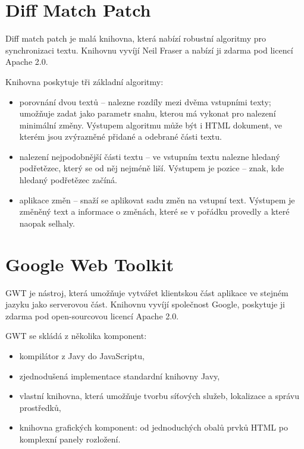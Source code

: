 \section{Diff Match Patch}
Diff match patch je malá knihovna, která nabízí robustní algoritmy pro synchronizaci textu.
Knihovnu vyvíjí Neil Fraser a nabízí ji zdarma pod licencí Apache 2.0\cite{apache20}.

Knihovna poskytuje tři základní algoritmy:
\begin{itemize}
	\item porovnání dvou textů -- nalezne rozdíly mezi dvěma vstupními texty; umožňuje zadat jako parametr snahu, kterou má vykonat pro nalezení minimální změny.
		Výstupem algoritmu může být i HTML dokument, ve kterém jsou zvýrazněné přidané a odebrané části textu.
	\item nalezení nejpodobnější části textu -- ve vstupním textu nalezne hledaný podřetězec, který se od něj nejméně liší.
		Výstupem je pozice -- znak, kde hledaný podřetězec začíná.
	\item aplikace změn -- snaží se aplikovat sadu změn na vstupní text.
		Výstupem je změněný text a informace o změnách, které se v pořádku provedly a které naopak selhaly.
\end{itemize}

\section{Google Web Toolkit}

GWT je nástroj, která umožňuje vytvářet klientskou část aplikace ve stejném jazyku jako serverovou část.
Knihovnu vyvíjí společnost Google, poskytuje ji zdarma pod open-sourcovou licencí Apache 2.0\cite{apache20}.

GWT se skládá z několika komponent:
\begin{itemize}
	\item kompilátor z Javy do JavaScriptu,
	\item zjednodušená implementace standardní knihovny Javy,
	\item vlastní knihovna, která umožňuje tvorbu síťových služeb, lokalizace a správu prostředků,
	\item knihovna grafických komponent: od jednoduchých obalů prvků HTML po komplexní panely rozložení.
\end{itemize}

